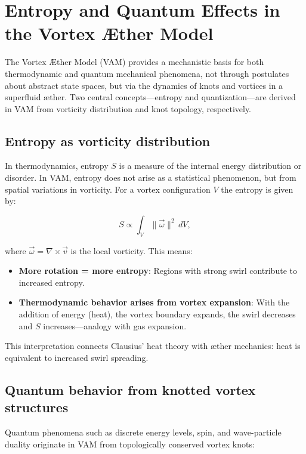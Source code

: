 \section{Entropy and Quantum Effects in the Vortex Æther Model}

The Vortex Æther Model (VAM) provides a mechanistic basis for both thermodynamic and quantum mechanical phenomena, not through postulates about abstract state spaces, but via the dynamics of knots and vortices in a superfluid æther. Two central concepts—entropy and quantization—are derived in VAM from vorticity distribution and knot topology, respectively.

\subsection{Entropy as vorticity distribution}

In thermodynamics, entropy $S$ is a measure of the internal energy distribution or disorder. In VAM, entropy does not arise as a statistical phenomenon, but from spatial variations in vorticity. For a vortex configuration $V$ the entropy is given by:

\begin{equation}
    S \propto \int_V \|\vec{\omega}\|^2 \, dV,
\end{equation}

where $\vec{\omega} = \nabla \times \vec{v}$ is the local vorticity. This means:

\begin{itemize}
    \item \textbf{More rotation = more entropy}: Regions with strong swirl contribute to increased entropy.
    \item \textbf{Thermodynamic behavior arises from vortex expansion}: With the addition of energy (heat), the vortex boundary expands, the swirl decreases and $S$ increases—analogy with gas expansion.
\end{itemize}

This interpretation connects Clausius' heat theory with æther mechanics: heat is equivalent to increased swirl spreading.

\subsection{Quantum behavior from knotted vortex structures}

Quantum phenomena such as discrete energy levels, spin, and wave-particle duality originate in VAM from topologically conserved vortex knots:

